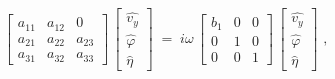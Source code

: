 \begin{equation}
\begin{bmatrix}
a_{11} & a_{12} & 0 \\[4pt]
a_{21} & a_{22} & a_{23} \\[4pt]
a_{31} & a_{32} & a_{33}
\end{bmatrix}
\,\begin{bmatrix}
\widehat{v_y} \\[4pt]
\widehat{\varphi} \\[4pt]
\widehat{\eta}
\end{bmatrix}
\;=\; i \omega
\,\begin{bmatrix}
  b_1 & 0 & 0 \\[4pt]
    0 & 1 & 0 \\[4pt]
    0 & 0 & 1
\end{bmatrix}
\,\begin{bmatrix}
\widehat{v_y} \\[4pt]
\widehat{\varphi} \\[4pt]
\widehat{\eta}
\end{bmatrix} \text{ ,}
\label{eq:eigensistem-general}
\end{equation}

